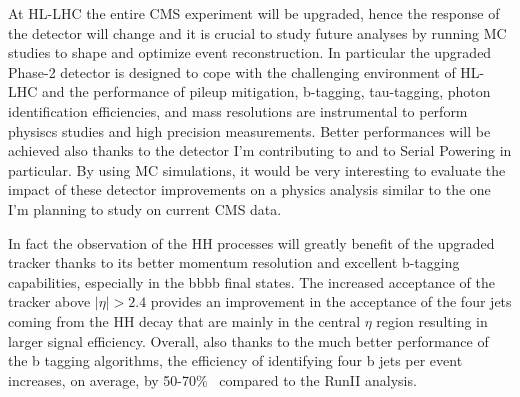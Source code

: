 \documentclass[a4paper,11pt,english]{article}
\begin{document}
\begin{description}[style=unboxed,leftmargin=.2cm]
\item[Simulation based Phase-2 physics studies: HH$\to$bbbb.] At HL-LHC %
the entire CMS experiment will be upgraded, hence the response of the detector will change and it is crucial to study future analyses by running MC studies to shape and optimize event reconstruction. In particular the upgraded Phase-2 detector is designed to cope with the challenging environment of \mbox{HL-LHC} and the performance of pileup mitigation, b-tagging, tau-tagging, photon identification efficiencies, and mass resolutions are instrumental to perform physiscs studies and high precision measurements. 
Better performances will be achieved also thanks to the detector I'm contributing to and to Serial Powering in particular. By using MC simulations, it would be very interesting to evaluate the impact of these detector improvements on a physics analysis similar to the one I'm planning to study on current CMS data. %

In fact the observation of the HH processes will greatly benefit of the upgraded tracker thanks to its better momentum resolution and excellent b-tagging capabilities, especially in the bbbb final states. The increased acceptance of the tracker above $\mid \eta \mid > 2.4$ provides an improvement in the acceptance of the four jets coming from the HH decay that are mainly in the central $\eta$ region resulting in larger signal efficiency. Overall, also thanks to the much better performance of the b tagging algorithms, the efficiency of identifying four b jets per event increases, on average, by 50-70\%~\cite{TDR} compared to the RunII analysis.
\begin{siderules}
\end{siderules}
\end{description}
\end{document}
